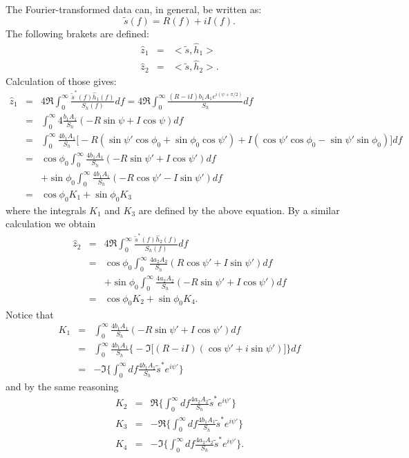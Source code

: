 The Fourier-transformed data can, in general, be written as:
\begin{equation}
\tilde{s}(f) = R(f) + i I(f).
\end{equation}
The following brakets are defined:
\begin{eqnarray}
\hat{z}_1 &=& <\tilde{s}, \hat{h}_1> \\
\hat{z}_2 &=& <\tilde{s}, \hat{h}_2> .
\end{eqnarray}
Calculation of those gives:
\begin{eqnarray}
\hat{z}_1 &=&  4 \Re \int_{0}^{\infty} \frac{\tilde{s}^{\ast}(f)
\hat{h}_1(f)}{S_h(f)} df
    =  4 \Re \int_{0}^{\infty} \frac{ (R-iI) b_1 A_1 e^{i (\psi+\pi/2)}}
{S_h} df \\
    &=& \int_0^{\infty} 4 \frac{b_1 A_1}{S_h} (-R \sin\psi + I\cos\psi) df \\
    &=&\int_0^{\infty} \frac{4 b_1 A_1}{S_h} \Big [ -R (\sin\psi'\cos\phi_0
+\sin\phi_0 \cos\psi') + I(\cos\psi'\cos\phi_0-\sin\psi'\sin\phi_0) \Big ] df\\
    &=& \cos\phi_0 \int_0^{\infty} \frac{4 b_1 A_1}{S_h} (-R \sin\psi'+
I\cos\psi') df \\
    &&+\sin\phi_0 \int_0^{\infty} \frac{4 b_1 A_1}{S_h} (-R\cos\psi'
-I\sin\psi') df \\
    &=&\cos\phi_0 K_1 + \sin\phi_0 K_3 
\label{z1}
\end{eqnarray}
where the integrals $K_1$ and $K_3$ are defined by the above equation.
By a similar calculation we obtain
\begin{eqnarray}
\hat{z}_2 &=&  4 \Re \int_{0}^{\infty} \frac{\tilde{s}^{\ast}(f) \hat{h}_2(f)}
{S_h(f)} df \\
    &=& \cos\phi_0 \int_0^{\infty} \frac{4 a_2 A_2}{S_h} (R\cos\psi'
+I\sin\psi') df  \\
    &&+\sin\phi_0 \int_0^{\infty} \frac{4 a_2 A_2}{S_h} (-R\sin\psi'
+I\cos\psi')df\\
    &=& \cos\phi_0 K_2 + \sin\phi_0 K_4.
\label{z2}
\end{eqnarray}
Notice that
\begin{eqnarray}
K_1 &=& \int_0^{\infty} \frac{4 b_1 A_1}{S_h}(-R\sin\psi'+I\cos\psi')df \\
    &=&\int_0^{\infty} \frac{4 b_1 A_1}{S_h} \bigg \{ - \Im\Big [(R-iI)
	 (\cos\psi'+i\sin\psi')\Big ] \bigg \} df \\
	&=&-\Im \Big \{\int_0^{\infty} df \frac{4 b_1 A_1}{S_h} \tilde{s}^{\ast}
	 e^{i \psi'}  \Big \} 
\label{K1}
\end{eqnarray}
and by the same reasoning
\begin{eqnarray}
\label{K2}
K_2 &=& \Re \Big \{ \int_0^{\infty} df \frac{4 a_2 A_2}{S_h} \tilde{s}^{\ast}
	e^{i \psi'} \Big \} \\
\label{K3}
K_3 &=& - \Re \Big \{ \int_0^{\infty} df \frac{4 b_1 A_1}{S_h} \tilde{s}^{\ast}
	e^{i \psi'} \Big \} \\
\label{K4}
K_4 &=& -\Im \Big \{ \int_0^{\infty} df \frac{4 a_2 A_2}{S_h} \tilde{s}^{\ast}
	e^{i \psi'} \Big \}.
\end{eqnarray}

